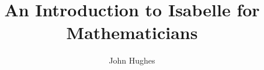 \documentclass[11pt,notitlepage,openany,oneside]{book}
\begin{document}
\title{An Introduction to Isabelle for Mathematicians}
\author{John Hughes}
\maketitle  
 

\tableofcontents





%
%
%



\end{document}
